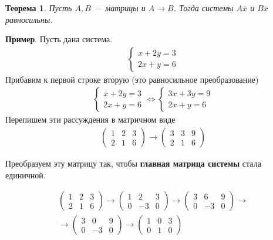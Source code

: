 \documentclass[]{article}
\newtheorem{thr}{Теорема}
\begin{document}
\begin{thr}
	Пусть $A,B$ --- матрицы и $A\rightarrow B$. Тогда системы $A\overline{x}$ и $B\overline{x}$ равносильны.
\end{thr}

\textbf{Пример}. Пусть дана система. 
\begin{gather*}
	\begin{cases}
		x+2y=3
		\\
		2x+y=6
	\end{cases}
\end{gather*}
Прибавим к первой строке вторую (это равносильное преобразование)
\begin{gather*}
	\begin{cases}
		x+2y=3
		\\
		2x+y=6
	\end{cases}
	\Leftrightarrow 
	\begin{cases}
		3x+3y=9
		\\
		2x+y=6
	\end{cases}
\end{gather*}
Перепишем эти рассуждения в матричном виде
\begin{gather*}
	\left(
	\begin{array}{ll|l}
		1 & 2 & 3
		\\
		2 & 1 & 6
	\end{array}
	\right)
	\rightarrow
	\left(
	\begin{array}{ll|l}
		3 & 3 & 9
		\\
		2 & 1 & 6
	\end{array}
	\right)
\end{gather*}

Преобразуем эту матрицу так, чтобы \textbf{главная матрица системы} стала единичной.

\begin{gather*}
	\left(
	\begin{array}{ll|l}
		1 & 2 & 3
		\\
		2 & 1 & 6
	\end{array}
	\right)
	\rightarrow
	\left(
\begin{array}{ll|l}
	1 & 2 & 3
	\\
	0 & -3 & 0
\end{array}
\right)
\rightarrow
	\left(
\begin{array}{ll|l}
	3 & 6 & 9
	\\
	0 & -3 & 0
\end{array}
\right)
\rightarrow
\\
\rightarrow
\left(
\begin{array}{ll|l}
	3 & 0 & 9
	\\
	0 & -3 & 0
\end{array}
\right)
\rightarrow
\left(
\begin{array}{ll|l}
	1 & 0 & 3
	\\
	0 & 1 & 0
\end{array}
\right)
\end{gather*}
\end{document}
